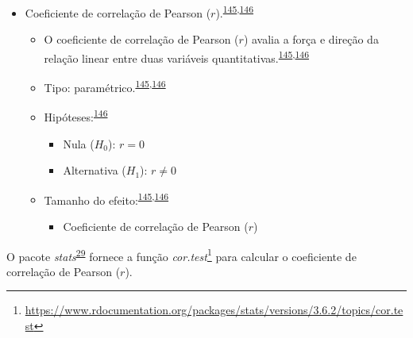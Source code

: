 \documentclass[
  a4paper,
]{book}
\providecommand{\tightlist}{%
  \setlength{\itemsep}{0pt}\setlength{\parskip}{0pt}}
\renewcommand{\href}[2]{#2\footnote{\url{#1}}}
\newenvironment{infobox}[1]
  {
  \begin{itemize}
  \renewcommand{\labelitemi}{
    \raisebox{-.7\height}[0pt][0pt]{
      {\setkeys{Gin}{width=3em,keepaspectratio}
        \texttt{[image: \#1]}}
    }
  }
  \setlength{\fboxsep}{1em}
  \begin{blackbox}
  \item
  }
  {
  \end{blackbox}
  \end{itemize}
  }
\begin{document}
\begin{itemize}
\item
  Coeficiente de correlação de Pearson (\(r\)).\textsuperscript{\protect\hyperlink{ref-khamis2008}{145},\protect\hyperlink{ref-allison2022}{146}}

  \begin{itemize}
  \item
    O coeficiente de correlação de Pearson (\(r\)) avalia a força e direção da relação linear entre duas variáveis quantitativas.\textsuperscript{\protect\hyperlink{ref-khamis2008}{145},\protect\hyperlink{ref-allison2022}{146}}
  \item
    Tipo: paramétrico.\textsuperscript{\protect\hyperlink{ref-khamis2008}{145},\protect\hyperlink{ref-allison2022}{146}}
  \item
    Hipóteses:\textsuperscript{\protect\hyperlink{ref-allison2022}{146}}

    \begin{itemize}
    \item
      Nula (\(H_{0}\)): \(r=0\)
    \item
      Alternativa (\(H_{1}\)): \(r≠0\)
    \end{itemize}
  \item
    Tamanho do efeito:\textsuperscript{\protect\hyperlink{ref-khamis2008}{145},\protect\hyperlink{ref-allison2022}{146}}

    \begin{itemize}
    \tightlist
    \item
      Coeficiente de correlação de Pearson (\(r\))
    \end{itemize}
  \end{itemize}
\end{itemize}

\begin{infobox}{images/Rlogo}
O pacote \emph{stats}\textsuperscript{\protect\hyperlink{ref-stats-2}{29}} fornece a função \href{https://www.rdocumentation.org/packages/stats/versions/3.6.2/topics/cor.test}{\emph{cor.test}} para calcular o coeficiente de correlação de Pearson (\(r\)).

\end{infobox}
\end{document}
